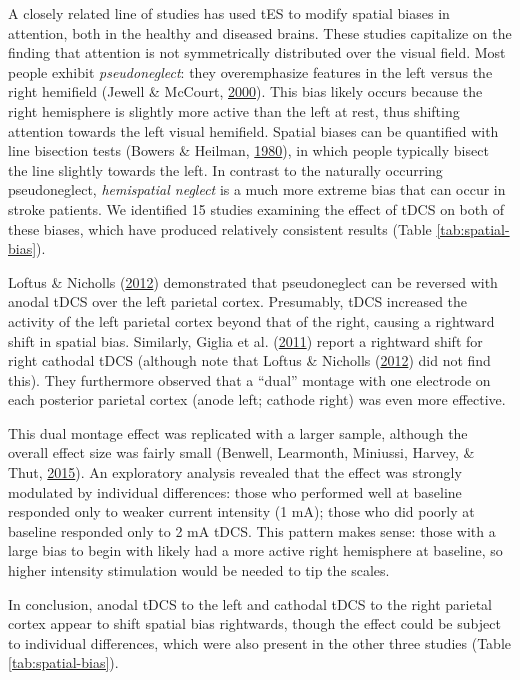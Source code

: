 \documentclass[11pt,]{memoir}
\begin{document}
A closely related line of studies has used tES to modify spatial biases in attention, both in the healthy and diseased brains. These studies capitalize on the finding that attention is not symmetrically distributed over the visual field. Most people exhibit \emph{pseudoneglect}: they overemphasize features in the left versus the right hemifield (Jewell \& McCourt, \protect\hyperlink{ref-Jewell2000}{2000}). This bias likely occurs because the right hemisphere is slightly more active than the left at rest, thus shifting attention towards the left visual hemifield. Spatial biases can be quantified with line bisection tests (Bowers \& Heilman, \protect\hyperlink{ref-Bowers1980}{1980}), in which people typically bisect the line slightly towards the left. In contrast to the naturally occurring pseudoneglect, \emph{hemispatial neglect} is a much more extreme bias that can occur in stroke patients. We identified 15 studies examining the effect of tDCS on both of these biases, which have produced relatively consistent results (Table \ref{tab:spatial-bias}).

Loftus \& Nicholls (\protect\hyperlink{ref-Loftus2012}{2012}) demonstrated that pseudoneglect can be reversed with anodal tDCS over the left parietal cortex. Presumably, tDCS increased the activity of the left parietal cortex beyond that of the right, causing a rightward shift in spatial bias. Similarly, Giglia et al. (\protect\hyperlink{ref-Giglia2011}{2011}) report a rightward shift for right cathodal tDCS (although note that Loftus \& Nicholls (\protect\hyperlink{ref-Loftus2012}{2012}) did not find this). They furthermore observed that a ``dual'' montage with one electrode on each posterior parietal cortex (anode left; cathode right) was even more effective.

This dual montage effect was replicated with a larger sample, although the overall effect size was fairly small (Benwell, Learmonth, Miniussi, Harvey, \& Thut, \protect\hyperlink{ref-Benwell2015}{2015}). An exploratory analysis revealed that the effect was strongly modulated by individual differences: those who performed well at baseline responded only to weaker current intensity (1 mA); those who did poorly at baseline responded only to 2 mA tDCS. This pattern makes sense: those with a large bias to begin with likely had a more active right hemisphere at baseline, so higher intensity stimulation would be needed to tip the scales.

In conclusion, anodal tDCS to the left and cathodal tDCS to the right parietal cortex appear to shift spatial bias rightwards, though the effect could be subject to individual differences, which were also present in the other three studies (Table \ref{tab:spatial-bias}).
\end{document}
